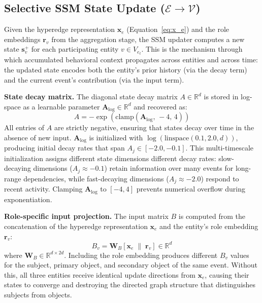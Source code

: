 \documentclass[letterpaper,twocolumn,10pt]{article}
\begin{document}
\subsection{Selective SSM State Update ($\mathcal{E} \to \mathcal{V}$)}
\label{sec:ssm_update}

Given the hyperedge representation $\mathbf{x}_e$ (Equation~\ref{eq:x_e}) and the role embeddings $\mathbf{r}_v$ from the aggregation stage, the SSM updater computes a new state $\mathbf{s}_v^{+}$ for each participating entity $v \in V_{e_t}$. This is the mechanism through which accumulated behavioral context propagates across entities and across time: the updated state encodes both the entity's prior history (via the decay term) and the current event's contribution (via the input term).

\textbf{State decay matrix.} The diagonal state decay matrix $A \in \mathbb{R}^d$ is stored in log-space as a learnable parameter $\mathbf{A}_{\log} \in \mathbb{R}^d$ and recovered as:
\begin{equation}
    A = -\exp\!\left(\text{clamp}(\mathbf{A}_{\log},\, -4,\, 4)\right)
    \label{eq:A}
\end{equation}
All entries of $A$ are strictly negative, ensuring that states decay over time in the absence of new input. $\mathbf{A}_{\log}$ is initialized with $\log(\text{linspace}(0.1, 2.0, d))$, producing initial decay rates that span $A_j \in [-2.0, -0.1]$. This multi-timescale initialization assigns different state dimensions different decay rates: slow-decaying dimensions ($A_j \approx -0.1$) retain information over many events for long-range dependencies, while fast-decaying dimensions ($A_j \approx -2.0$) respond to recent activity. Clamping $\mathbf{A}_{\log}$ to $[-4, 4]$ prevents numerical overflow during exponentiation.

\textbf{Role-specific input projection.} The input matrix $B$ is computed from the concatenation of the hyperedge representation $\mathbf{x}_e$ and the entity's role embedding $\mathbf{r}_v$:
\begin{equation}
    B_v = \mathbf{W}_B [\mathbf{x}_e \;\|\; \mathbf{r}_v] \in \mathbb{R}^d
    \label{eq:B}
\end{equation}
where $\mathbf{W}_B \in \mathbb{R}^{d \times 2d}$. Including the role embedding produces different $B_v$ values for the subject, primary object, and secondary object of the same event. Without this, all three entities receive identical update directions from $\mathbf{x}_e$, causing their states to converge and destroying the directed graph structure that distinguishes subjects from objects.
\end{document}

